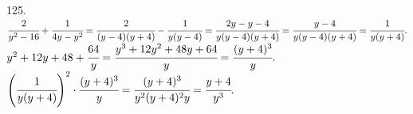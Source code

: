 125. $\cfrac{2}{y^2-16}+\cfrac{1}{4y-y^2}=\cfrac{2}{(y-4)(y+4)}-\cfrac{1}{y(y-4)}=\cfrac{2y-y-4}{y(y-4)(y+4)}=\cfrac{y-4}{y(y-4)(y+4)}=\cfrac{1}{y(y+4)}.$\\
$y^2+12y+48+\cfrac{64}{y}=\cfrac{y^3+12y^2+48y+64}{y}=\cfrac{(y+4)^3}{y}.$\\
$\left(\cfrac{1}{y(y+4)}\right)^2\cdot\cfrac{(y+4)^3}{y}=\cfrac{(y+4)^3}{y^2(y+4)^2y}=\cfrac{y+4}{y^3}.$\\

